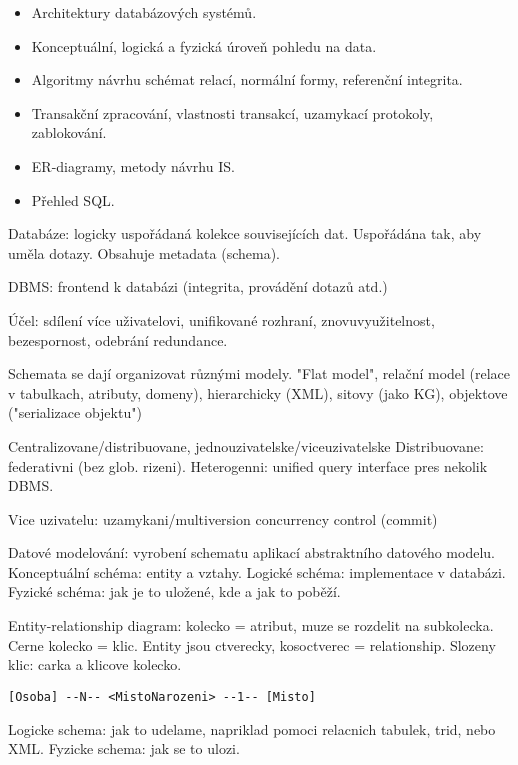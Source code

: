 \begin{itemize}
\item Architektury databázových systémů.
\item Konceptuální, logická a fyzická úroveň pohledu na data.
\item Algoritmy návrhu schémat relací, normální formy, referenční integrita.
\item Transakční zpracování, vlastnosti transakcí, uzamykací protokoly,
zablokování.
\item ER-diagramy, metody návrhu IS.
\item Přehled SQL.
\end{itemize}

Databáze: logicky uspořádaná kolekce souvisejících dat.
Uspořádána tak, aby uměla dotazy. Obsahuje metadata (schema).

DBMS: frontend k databázi (integrita, provádění dotazů atd.)

Účel: sdílení více uživatelovi, unifikované rozhraní, znovuvyužitelnost,
bezespornost, odebrání redundance.

Schemata se dají organizovat různými modely.
"Flat model", relační model (relace v tabulkach, atributy, domeny),
hierarchicky (XML), sitovy (jako KG), objektove ("serializace objektu")

Centralizovane/distribuovane, jednouzivatelske/viceuzivatelske
Distribuovane: federativni (bez glob. rizeni). Heterogenni: unified query
interface pres nekolik DBMS.

Vice uzivatelu: uzamykani/multiversion concurrency control (commit)

Datové modelování: vyrobení schematu aplikací abstraktního datového modelu.
Konceptuální schéma: entity a vztahy. Logické schéma: implementace v databázi.
Fyzické schéma: jak je to uložené, kde a jak to poběží.

Entity-relationship diagram: kolecko = atribut, muze se rozdelit na subkolecka.
Cerne kolecko = klic. Entity jsou ctverecky, kosoctverec = relationship.
Slozeny klic: carka a klicove kolecko.

\verb#[Osoba] --N-- <MistoNarozeni> --1-- [Misto]#

Logicke schema: jak to udelame, napriklad pomoci relacnich tabulek, trid,
nebo XML. Fyzicke schema: jak se to ulozi.

